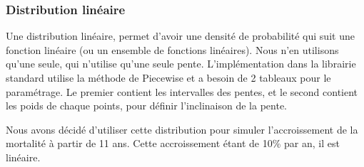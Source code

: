 \documentclass[11)pt,a4paper]{article}
\begin{document}
        \subsubsection{Distribution linéaire}
            Une distribution linéaire, permet d'avoir une densité de probabilité qui suit une fonction linéaire 
            (ou un ensemble de fonctions linéaires). Nous n'en utilisons qu'une seule, qui n'utilise qu'une seule pente.
            L'implémentation dans la librairie standard utilise la méthode de Piecewise et a besoin de 2 tableaux pour le paramétrage.
            Le premier contient les intervalles des pentes, et le second contient les poids de chaque points, pour définir l'inclinaison de la pente.
            \par
            Nous avons décidé d'utiliser cette distribution pour simuler l'accroissement de la mortalité à partir de 11 ans. Cette accroissement étant de 10\% par an, il est linéaire.
            \begin{mdframed}[backgroundcolor=light-gray, roundcorner=20pt, innerleftmargin=20, innertopmargin=1, innerbottommargin=1, outerlinewidth=1, linecolor=darkgray]
                
            \end{mdframed}
            \begin{mdframed}[backgroundcolor=light-gray, roundcorner=20pt, innerleftmargin=20, innertopmargin=1, innerbottommargin=1, outerlinewidth=1, linecolor=darkgray]
                
            \end{mdframed}
            \begin{mdframed}[backgroundcolor=light-gray, roundcorner=20pt, innerleftmargin=20, innertopmargin=1, innerbottommargin=1, outerlinewidth=1, linecolor=darkgray]
                
            \end{mdframed}
            \begin{mdframed}[backgroundcolor=light-gray, roundcorner=20pt, innerleftmargin=20, innertopmargin=1, innerbottommargin=1, outerlinewidth=1, linecolor=darkgray]
                
            \end{mdframed}
\end{document}
